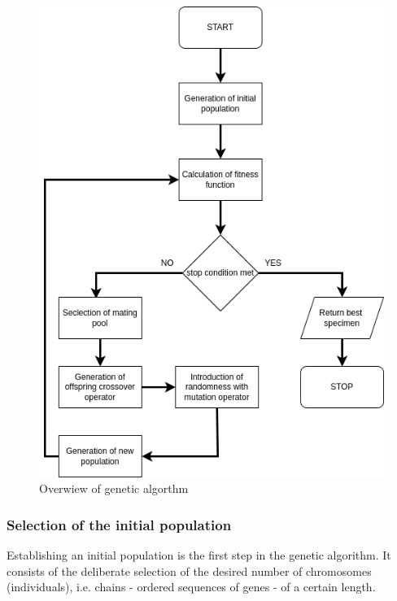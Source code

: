 \begin{figure}[htb] 
	\centering
	\includegraphics[width=\textwidth]{figures/genetic_algorithm}
	\caption{Overwiew of genetic algorthm}
	\label{fig:genetic_algorithm}
\end{figure}

\FloatBarrier
\subsubsection{Selection of the initial population} 
Establishing an initial population is the first step in the genetic algorithm. 
It consists of the deliberate selection of the desired number of chromosomes (individuals), 
i.e. chains - ordered sequences of genes - of a certain length.

